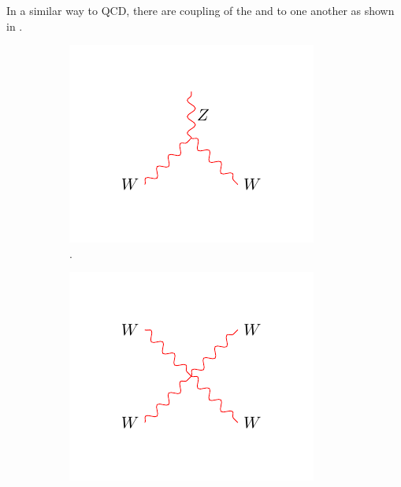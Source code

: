 In a similar way to {QCD}, there are coupling of the \PW and \PZ to one
another as shown in .

\begin{figure}[htbp]
  \centering
  \begin{subfigure}{0.3\textwidth}
    \centering
    \includegraphics[width=\textwidth]{weak_WWZ}
    \caption{\HepProcess{\PW\PW\PZ}.}
    \label{fig:weak_WWZ}
  \end{subfigure}
  \begin{subfigure}{0.3\textwidth}
    \centering
    \includegraphics[width=\textwidth]{weak_WWWW}

\end{subfigure}
\end{figure}
